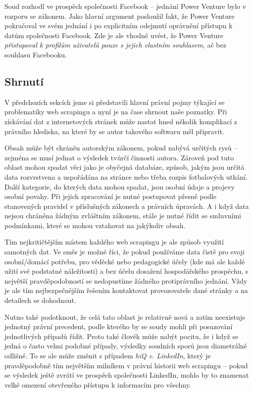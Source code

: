 \documentclass[thesis=B,czech]{FITthesis}[2012/06/26]
\begin{document}
Soud rozhodl ve prospěch společnosti Facebook -- jednání Power Venture bylo v rozporu se zákonem. Jako hlavní argument posloužil fakt, že Power Venture pokračoval ve svém jednání i po explicitním odejmutí oprávnění přístupu k datům společnosti Facebook. Zde je ale vhodné uvést, že Power Venture \emph{přistupoval k profilům uživatelů pouze s jejich vlastním souhlasem}, ač bez souhlasu Facebooku.\cite{facebook_venture_2}

\subsection{Shrnutí}

V předchozích sekcích jsme si představili hlavní právní pojmy týkající se problematiky web scrapingu a nyní je na čase shrnout naše poznatky. Při získávání dat z internetových stránek může nastat hned několik komplikací z právního hlediska, na které by se autor takového softwaru měl připravit.

Obsah může být chráněn autorským zákonem, pokud nabývá určitých rysů -- zejména se musí jednat o výsledek tvůrčí činnosti autora. Zároveň pod tuto oblast mohou spadat věci jako je obyčejná databáze, způsob, jakým jsou určitá data rozvrstvena a uspořádána na stránce nebo třeba rozpis fotbalových utkání. Další kategorie, do kterých data mohou spadat, jsou osobní údaje a projevy osobní povahy. Při jejich zpracování je nutné postupovat přesně podle stanovených pravidel v příslušných zákonech a právních úpravách. A i když data nejsou chráněna žádným zvláštním zákonem, stále je nutné řídit se smluvními podmínkami, které se mohou vztahovat na jakýkoliv obsah.

Tím nejkritičtějším místem každého web scrapingu je ale způsob využití samotných dat. Ve směs je možné říci, že pokud používáme data čistě pro svoji osobní/domácí potřebu, pro věděcké nebo pedagogické účely (kde má ale každé užití své podstatné náležitosti) a bez účelu dosažení hospodářského prospěchu, s největší pravděpodobností se nedopustíme žádného protiprávního jednání. Vždy je ale tím nejbezpečnějším řešením kontaktovat provozovatele dané stránky a na detailech se dohodnout.

Nutno také podotknout, že celá tato oblast je relativně nová a zatím neexistuje jednotný právní precedent, podle kterého by se soudy mohli při posuzování jednotlivých případů řídit. Proto také člověk může nabýt pocitu, že i když se jedná o často velmi podobné případy, výsledky soudních sporů jsou diametrálně odlišné. To se ale může změnit s případem \emph{hiQ v. LinkedIn}, který je pravděpodobně tím největším milníkem v právní historii web scrapingu -- pokud se výsledek ještě zvrátí ve prospěch společnosti LinkedIn, mohlo by to znamenat velké omezení otevřeného přístupu k informacím pro všechny.
\end{document}
